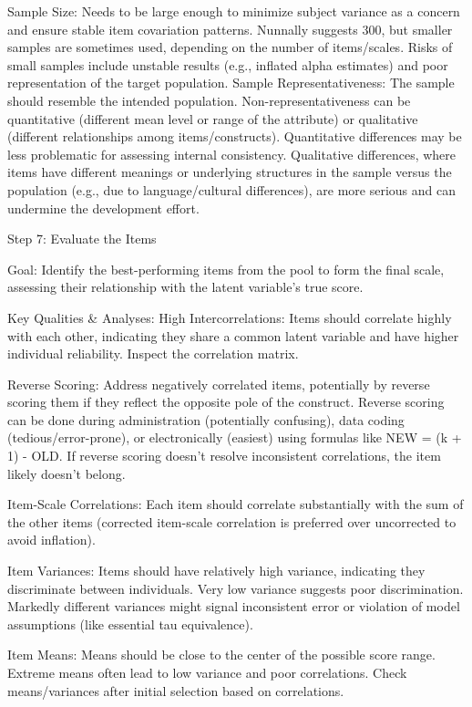 \documentclass[
]{article}
\begin{document}
Sample Size: Needs to be large enough to minimize subject variance as a
concern and ensure stable item covariation patterns. Nunnally suggests
300, but smaller samples are sometimes used, depending on the number of
items/scales. Risks of small samples include unstable results (e.g.,
inflated alpha estimates) and poor representation of the target
population. Sample Representativeness: The sample should resemble the
intended population. Non-representativeness can be quantitative
(different mean level or range of the attribute) or qualitative
(different relationships among items/constructs). Quantitative
differences may be less problematic for assessing internal consistency.
Qualitative differences, where items have different meanings or
underlying structures in the sample versus the population (e.g., due to
language/cultural differences), are more serious and can undermine the
development effort.

Step 7: Evaluate the Items

Goal: Identify the best-performing items from the pool to form the final
scale, assessing their relationship with the latent variable's true
score.

Key Qualities \& Analyses: High Intercorrelations: Items should
correlate highly with each other, indicating they share a common latent
variable and have higher individual reliability. Inspect the correlation
matrix.

Reverse Scoring: Address negatively correlated items, potentially by
reverse scoring them if they reflect the opposite pole of the construct.
Reverse scoring can be done during administration (potentially
confusing), data coding (tedious/error-prone), or electronically
(easiest) using formulas like NEW = (k + 1) - OLD. If reverse scoring
doesn't resolve inconsistent correlations, the item likely doesn't
belong.

Item-Scale Correlations: Each item should correlate substantially with
the sum of the other items (corrected item-scale correlation is
preferred over uncorrected to avoid inflation).

Item Variances: Items should have relatively high variance, indicating
they discriminate between individuals. Very low variance suggests poor
discrimination. Markedly different variances might signal inconsistent
error or violation of model assumptions (like essential tau
equivalence).

Item Means: Means should be close to the center of the possible score
range. Extreme means often lead to low variance and poor correlations.
Check means/variances after initial selection based on correlations.
\end{document}
